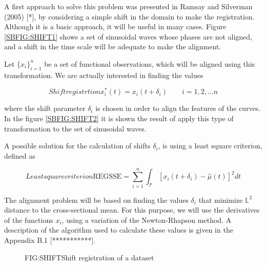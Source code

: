 A first approach to solve this problem was presented in Ramsay and Silverman
(2005) [*], by considering a simple shift in the domain to make the
registration. Although it is a basic approach, it will be useful in many cases.
Figure \ref{SBFIG:SHIFT1} shows a set of sinusoidal waves whose phases are not
aligned, and a shift in the time scale will be adequate to make the alignment.

Let $\{x_i\}_{i=1}^n$ be a set of functional observations, which will be aligned
using this transformation. We are actually interested in finding the values

\begin{equation}[]{Shift registrtion}
x_i^*(t)=x_i(t+ \delta_i) \qquad i=1,2, \dots n
\end{equation}

where the shift parameter $\delta_i$ is chosen in order to align the features of
the curves. In the figure \ref{SBFIG:SHIFT2} it is shown the result of apply
this type of transformation to the set of sinusoidal waves.



A possible solution for the calculation of shifts $\delta_i$, is using a least
square criterion, defined as

\begin{equation}[]{Least square criterion}
\text{REGSSE} = \sum_{i=1}^{n}\int_{\mathcal{T}}\left [x_i(t+\delta_i) - \hat \mu(t) \right ]^2 dt
\end{equation}

The alignment problem will be based on finding the values $\delta_i$ that
minimize $\mathbb{L}^2$ distance to the cross-sectional mean. For this purpose,
we will use the derivatives of the functions $x_i$, using a variation of the
Newton-Rhapson method. A description of the algorithm used to calculate these
values is given in the Appendix B.1 [***********].

\begin{figure}[Shift registration of a dataset]{FIG:SHIFT}{Shift registration of a dataset}
	 \quad
\end{figure}
